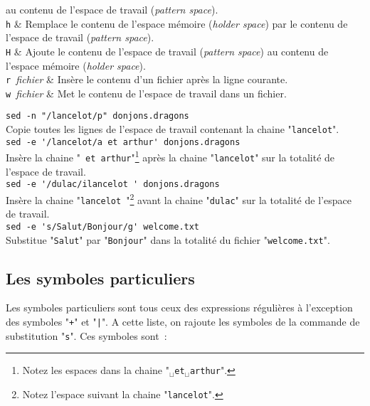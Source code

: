 \begin{tabular}
			au contenu de l'espace de travail ({\sl pattern space}).\\[1ex]
		{\tt h}			&
			Remplace le contenu de l'espace m{\'e}moire ({\sl holder space})
			par le contenu de l'espace de travail ({\sl pattern space}).\\[1ex]
		{\tt H}			&
			Ajoute le contenu de l'espace de travail ({\sl pattern space})
			au contenu de l'espace m{\'e}moire ({\sl holder space}).	\\[1ex]
		\verb*=r ={\it fichier}	&
			Ins{\`e}re le contenu d'un fichier apr{\`e}s la ligne courante.	\\[1ex]
		\verb*=w ={\it fichier}	&
			Met le contenu de l'espace de travail dans un fichier.	\\
	\hline
\end{tabular}

\begin{example}
\verb*=sed -n "/lancelot/p" donjons.dragons=\\[0.5cm]
Copie toutes les lignes de l'espace de travail contenant la chaine
"{\tt lancelot}".\\[0.5cm]

\verb*=sed -e '/lancelot/a et arthur' donjons.dragons=\\[0.5cm]
Ins{\`e}re la chaine "\verb*= et arthur="\footnote{Notez les espaces
dans la chaine "{\tt $_\sqcup$et$_\sqcup$arthur}".} apr{\`e}s la chaine
"{\tt lancelot}" sur la totalit{\'e} de l'espace de travail.\\[0.5cm]

\verb*=sed -e '/dulac/ilancelot ' donjons.dragons=\\[0.5cm]
Ins{\`e}re la chaine "\verb*=lancelot ="\footnote{Notez l'espace
suivant la chaine "{\tt lancelot}".} avant la chaine "{\tt dulac}"
sur la totalit{\'e} de l'espace de travail.\\[0.5cm]

\verb*=sed -e 's/Salut/Bonjour/g' welcome.txt=\\[0.5cm]
Substitue "{\tt Salut}" par "{\tt Bonjour}" dans la totalit{\'e}
du fichier "{\tt welcome.txt}".
\end{example}


\subsection{Les symboles particuliers}

Les symboles particuliers sont tous ceux des expressions r{\'e}guli{\`e}res {\`a}
l'exception des symboles "{\tt +}" et "{\tt |}". A cette liste,
on rajoute les symboles de la commande de substitution "{\tt s}".
Ces symboles sont~:

